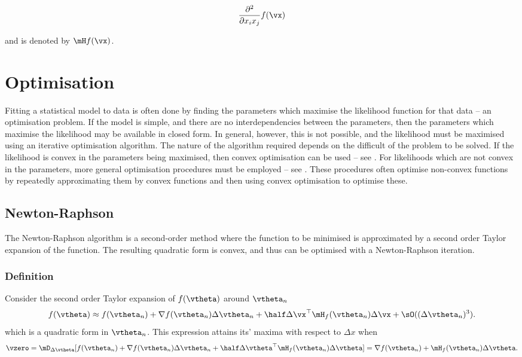 \[
	\frac{\partial^2}{\partial x_i x_j} f(\vx)
\]

and is denoted by $\mH f(\vx)$.

\section{Optimisation}
Fitting a statistical model to data is often done by finding the parameters which maximise the likelihood
function for that data -- an optimisation problem. If the model is simple, and there are no interdependencies
between the parameters, then the parameters which maximise the likelihood may be available in closed form. In
general, however, this is not possible, and the likelihood must be maximised using an iterative optimisation
algorithm. The nature of the algorithm required depends on the difficult of the problem to be solved. If the
likelihood is convex in the parameters being maximised, then convex optimisation can be used --
see \citep{Boyd2010}. For likelihoods which are not convex in the parameters, more general optimisation
procedures must be employed -- see \citep{Nocedal2006}. These procedures often optimise non-convex functions
by repeatedly approximating them by convex functions and then using convex optimisation to optimise these.

\subsection{Newton-Raphson}

The Newton-Raphson algorithm is a second-order method where the function to be minimised is approximated
by a second order Taylor expansion of the function. The resulting quadratic form is convex, and thus can
be optimised with a Newton-Raphson iteration.

\subsubsection{Definition}

Consider the second order Taylor expansion of $f(\vtheta)$ around $\vtheta_{n}$
\[
	f(\vtheta) \approx f(\vtheta_{n}) + \nabla f(\vtheta_{n}) \Delta \vtheta_{n} + \half \Delta \vx^\top \mH_f(\vtheta_{n}) \Delta \vx + \sO((\Delta \vtheta_{n})^3).
\]
which is a quadratic form in $\vtheta_n$. This expression attains its' maxima with respect to $\Delta x$ when
\[
	\vzero = \mD_{\Delta \vtheta} [f(\vtheta_{n}) + \nabla f(\vtheta_{n}) \Delta \vtheta_{n} + \half \Delta \vtheta^\top \mH_f(\vtheta_{n}) \Delta \vtheta] = \nabla f(\vtheta_n) + \mH_f(\vtheta_n) \Delta \vtheta.
\]


